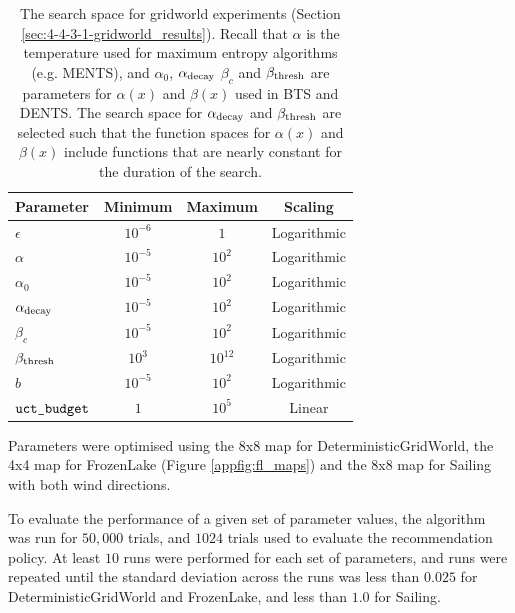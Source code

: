    \begin{table}[tbp]
        \centering
        \begin{tabular}{l|c|c|c} 
            Parameter   
                & Minimum    
                & Maximum    
                & Scaling \\
            \hline
            $\epsilon$      & $10^{-6}$     & $1$       & Logarithmic \\
            $\alpha$        & $10^{-5}$     & $10^2$    & Logarithmic \\
            $\alpha_0$      & $10^{-5}$     & $10^2$    & Logarithmic \\
            ${\alpha_{\text{decay}}}$   & $10^{-5}$     & $10^2$    & Logarithmic \\
            $\beta_c$       & $10^{-5}$     & $10^2$    & Logarithmic \\
            ${\beta_{\text{thresh}}}$   & $10^{3}$      & $10^{12}$ & Logarithmic \\
            $b$             & $10^{-5}$     & $10^2$    & Logarithmic \\
            ${\texttt{uct\_budget}}$    & $1$           & $10^5$    & Linear 
        \end{tabular}
        \caption[The  search space for gridworld experiments (Section \ref{sec:4-4-3-1-gridworld_results}).]{The  search space for gridworld experiments (Section \ref{sec:4-4-3-1-gridworld_results}). Recall that $\alpha$ is the temperature used for maximum entropy algorithms (e.g. MENTS), and $\alpha_0$, ${\alpha_{\text{decay}}}$ $\beta_c$ and ${\beta_{\text{thresh}}}$ are parameters for $\alpha(x)$ and $\beta(x)$ used in BTS and DENTS. The search space for ${\alpha_{\text{decay}}}$ and ${\beta_{\text{thresh}}}$ are selected such that the function spaces for $\alpha(x)$ and $\beta(x)$ include functions that are nearly constant for the duration of the search. \label{table:gridworld_hps_space}}
    \end{table}

    Parameters were optimised using the 8x8 map for DeterministicGridWorld, the 4x4 map for FrozenLake (Figure \ref{appfig:fl_maps}) and the 8x8 map for Sailing with both wind directions.

    To evaluate the performance of a given set of parameter values, the algorithm was run for $50{,}000$ trials, and $1024$ trials used to evaluate the recommendation policy. At least $10$ runs were performed for each set of parameters, and runs were repeated until the standard deviation across the runs was less than $0.025$ for DeterministicGridWorld and FrozenLake, and less than $1.0$ for Sailing.

